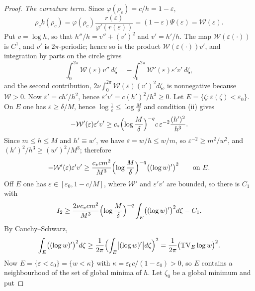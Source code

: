 \documentclass[11pt]{article}
\theoremstyle{definition}
\begin{document}
\begin{proof}
\emph{The curvature term.}  Since $\varphi(\rho_c)=c/h=1-\varepsilon$,
\begin{equation}
\rho_ck(\rho_c)=\varphi(\rho_c)\frac{r(\varepsilon)}{\varphi'(r(\varepsilon))}
=(1-\varepsilon)\Psi(\varepsilon)=\mathcal W(\varepsilon).
\end{equation}
Put $v=\log h$, so that $h''/h=v''+(v')^2$ and $v'=h'/h$. The map
$\mathcal W(\varepsilon(\cdot))$ is $C^1$, and $v'$ is $2\pi$-periodic; hence so
is the product $\mathcal W(\varepsilon(\cdot))v'$, and integration by parts on
the circle gives
\begin{equation}
\int_0^{2\pi}\mathcal W(\varepsilon)v''\,d\zeta
=-\int_0^{2\pi}\mathcal W'(\varepsilon)\varepsilon'v'\,d\zeta,
\end{equation}
and the second contribution,
$2\nu\int_0^{2\pi}\mathcal W(\varepsilon)(v')^2d\zeta$, is nonnegative because
$\mathcal W>0$. Now $\varepsilon'=ch'/h^2$, hence
$\varepsilon'v'=c(h')^2/h^3\ge0$. Let
$E=\{\zeta:\varepsilon(\zeta)<\varepsilon_0\}$. On $E$ one has
$\varepsilon\ge\delta/M$, hence $\log\frac1\varepsilon\le\log\frac M\delta$ and
condition (ii) gives
\begin{equation}
-\mathcal W'(\varepsilon)\varepsilon'v'\ge
c_*\Bigl(\log\frac M\delta\Bigr)^{-q}
c\,\varepsilon^{-2}\frac{(h')^2}{h^3}.
\end{equation}
Since $m\le h\le M$ and $h'\equiv w'$, we have $\varepsilon=w/h\le w/m$, so
$\varepsilon^{-2}\ge m^2/w^2$, and $(h')^2/h^3\ge(w')^2/M^3$; therefore
\begin{equation}
-\mathcal W'(\varepsilon)\varepsilon'v'\ge\frac{c_*cm^2}{M^3}
\Bigl(\log\frac M\delta\Bigr)^{-q}\bigl((\log w)'\bigr)^2
\qquad\text{on }E .
\end{equation}
Off $E$ one has $\varepsilon\in[\varepsilon_0,1-c/M]$, where $\mathcal W'$ and
$\varepsilon'v'$ are bounded, so there is $C_1$ with
\begin{equation}
I_2\ge\frac{2\nu c_*cm^2}{M^3}\Bigl(\log\frac M\delta\Bigr)^{-q}
\int_E\bigl((\log w)'\bigr)^2d\zeta-C_1 .
\end{equation}
By Cauchy--Schwarz,
\begin{equation}
\int_E\bigl((\log w)'\bigr)^2d\zeta
\ge\frac1{2\pi}\Bigl(\int_E\bigl|(\log w)'\bigr|d\zeta\Bigr)^2
=\frac1{2\pi}\bigl(\operatorname{TV}_E\log w\bigr)^2 .
\end{equation}
Now $E=\{\varepsilon<\varepsilon_0\}=\{w<\kappa\}$ with
$\kappa=\varepsilon_0c/(1-\varepsilon_0)>0$, so $E$ contains a neighbourhood of
the set of global minima of $h$. Let $\zeta_0$ be a global minimum and put

\end{proof}
\end{document}
